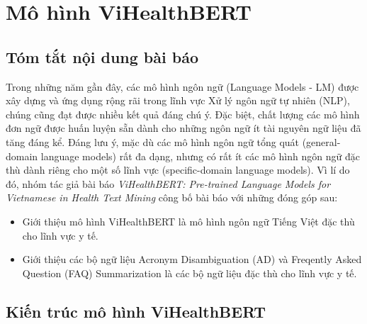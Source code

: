 \section{Mô hình ViHealthBERT}
\subsection{Tóm tắt nội dung bài báo}
Trong những năm gần đây, các mô hình ngôn ngữ (Language Models - LM) được xây dựng và ứng dụng rộng rãi trong lĩnh vực Xử lý ngôn ngữ tự nhiên (NLP), chúng cũng đạt được nhiều kết quả đáng chú ý. Đặc biệt, chất lượng các mô hình đơn ngữ được huấn luyện sẵn dành cho những ngôn ngữ ít tài nguyên ngữ liệu đã tăng đáng kể. Đáng lưu ý, mặc dù các mô hình ngôn ngữ tổng quát (general-domain language models) rất đa dạng, nhưng có rất ít các mô hình ngôn ngữ đặc thù dành riêng cho một số lĩnh vực (specific-domain language models). Vì lí do đó, nhóm tác giả bài báo \textit{ViHealthBERT: Pre-trained Language Models for Vietnamese in Health Text Mining}\cite{minh-EtAl:2022:LREC} công bố bài báo với những đóng góp sau:
\begin{itemize}
\item Giới thiệu mô hình ViHealthBERT là mô hình ngôn ngữ Tiếng Việt đặc thù cho lĩnh vực y tế.
\item Giới thiệu các bộ ngữ liệu Acronym Disambiguation (AD) và Freqently Asked Question (FAQ) Summarization là các bộ ngữ liệu đặc thù cho lĩnh vực y tế.
\end{itemize}

\subsection{Kiến trúc mô hình ViHealthBERT}
